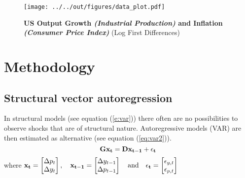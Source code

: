 \begin{figure}[ht]
  \footnotesize 
  \centering
  		\texttt{[image: ../../out/figures/data\_plot.pdf]}
  \vspace{3mm}
  \caption[US Output Growth \textit{(Industrial Production)} and Inflation \textit{(Consumer Price Index)}]{\textbf{US Output Growth \textit{(Industrial Production)} and Inflation \textit{(Consumer Price Index)}} (Log First Differences)}
  \label{plot}
\end{figure}


%
%
%
%
%
\clearpage
\section{Methodology}
\label{s:methodology}

\subsection{Structural vector autoregression}
\label{s:structural}

In structural models (see equation (\ref{e:var})) there often are no possibilities to observe shocks that are of structural nature. Autoregressive models (VAR) are then estimated as alternative (see equation (\ref{eq:var2})).
\begin{equation}
{\bf Gx_t}={\bf Dx_{t-1}}+{\bf \epsilon_t}
		\label{e:var}
\end{equation}
where $
{\bf x_t}
=
\begin{bmatrix}
\Delta p_t \\
\Delta y_t \\
\end{bmatrix}
,
\quad
{\bf x_{t-1}}
=
\begin{bmatrix}
\Delta y_{t-1} \\
\Delta p_{t-1} \\
\end{bmatrix}
\quad
\textrm{and}
\quad
{\bf \epsilon_t}
=
\begin{bmatrix}
\epsilon_{y,t} \\
\epsilon_{p,t} \\
\end{bmatrix}
$

